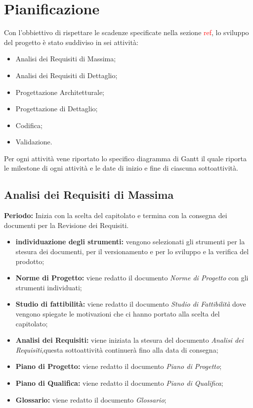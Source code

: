 \section{Pianificazione}
 
Con l'obbiettivo di rispettare le scadenze specificate nella sezione \textcolor{red}{ref}, lo sviluppo del progetto è stato suddiviso in sei attività:
 
\begin{itemize}
 
	\item Analisi dei Requisiti di Massima;
 
	\item Analisi dei Requisiti di Dettaglio;
 
	\item Progettazione Architetturale;
 
	\item Progettazione di Dettaglio;
 
	\item Codifica;
 
	\item Validazione.
 
\end{itemize}
 
Per ogni attività vene riportato lo specifico diagramma di Gantt il quale riporta le milestone di ogni attività e le date di inizio e fine di ciascuna sottoattività.
 

\subsection{Analisi dei Requisiti di Massima}
\textbf{Periodo:}
Inizia con la scelta del capitolato e termina con la consegna dei documenti per la Revisione dei Requisiti.
\begin{itemize}
	\item \textbf{individuazione degli strumenti:} vengono selezionati gli strumenti per la stesura dei documenti, per il versionamento e per lo sviluppo e la verifica del prodotto;
	\item \textbf{Norme di Progetto:} viene redatto il documento \emph{Norme di Progetto} con gli strumenti individuati;  
	\item \textbf{Studio di fattibilità:} viene redatto il documento \emph{Studio di Fattibilità} dove vengono spiegate le motivazioni che ci hanno portato alla scelta del capitolato;
	\item \textbf{Analisi dei Requisiti:} viene iniziata la stesura del documento \emph{Analisi dei Requisiti},questa sottoattività continuerà fino alla data di consegna;
	\item \textbf{Piano di Progetto:} viene redatto il documento \emph{Piano di Progetto}; 
	\item \textbf{Piano di Qualifica:} viene redatto il documento \emph{Piano di Qualifica};
	\item \textbf{Glossario:} viene redatto il documento \emph{Glossario};
\end{itemize}
